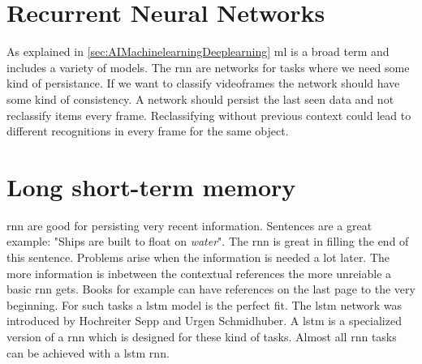 \documentclass[10pt,a4paper]{article}
\begin{document}
\section{Recurrent Neural Networks}
As explained in \autoref{sec:AIMachinelearningDeeplearning} \gls{ml} is a broad term and includes a variety of models. The \gls{rnn} are networks for tasks where we need some kind of persistance. If we want to classify videoframes the network should have some kind of consistency.\cite{Olah2015} A network should persist the last seen data and not reclassify items every frame. Reclassifying without previous context could lead to different recognitions in every frame for the same object.

\section{Long short-term memory}
\gls{rnn} are good for persisting very recent information. Sentences are a great example: "Ships are built to float on \textit{water}". The \gls{rnn} is great in filling the end of this sentence. Problems arise when the information is needed a lot later. The more information is inbetween the contextual references the more unreiable a basic \gls{rnn} gets. Books for example can have references on the last page to the very beginning. For such tasks a \gls{lstm} model is the perfect fit. The \gls{lstm} network was introduced by Hochreiter Sepp and Urgen Schmidhuber\citep{Hochreiter1997}. A \gls{lstm} is a specialized version of a \gls{rnn} which is designed for these kind of tasks. Almost all \gls{rnn} tasks can be achieved with a \gls{lstm} \gls{rnn}\cite{Olah2015}.
\end{document}
